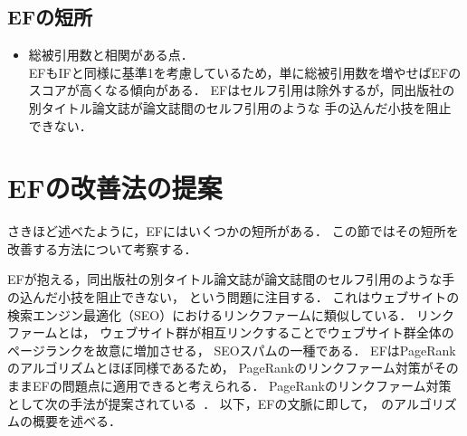 \subsection{EFの短所~\cite{Masuda2013}}
\begin{itemize}
    \item 総被引用数と相関がある点．\\
    EFもIFと同様に基準1を考慮しているため，単に総被引用数を増やせばEFのスコアが高くなる傾向がある．
    EFはセルフ引用は除外するが，同出版社の別タイトル論文誌が論文誌間のセルフ引用のような
    手の込んだ小技を阻止できない．
\end{itemize}

\section{EFの改善法の提案}
さきほど述べたように，EFにはいくつかの短所がある．
この節ではその短所を改善する方法について考察する．
\par
EFが抱える，同出版社の別タイトル論文誌が論文誌間のセルフ引用のような手の込んだ小技を阻止できない，
という問題に注目する．
これはウェブサイトの検索エンジン最適化（SEO）におけるリンクファームに類似している．
リンクファームとは，
ウェブサイト群が相互リンクすることでウェブサイト群全体のページランクを故意に増加させる，
SEOスパムの一種である．
EFはPageRankのアルゴリズムとほぼ同様であるため，
PageRankのリンクファーム対策がそのままEFの問題点に適用できると考えられる．
PageRankのリンクファーム対策として次の手法が提案されている~\cite{wu2005}．
以下，EFの文脈に即して，~\cite{wu2005}のアルゴリズムの概要を述べる．
